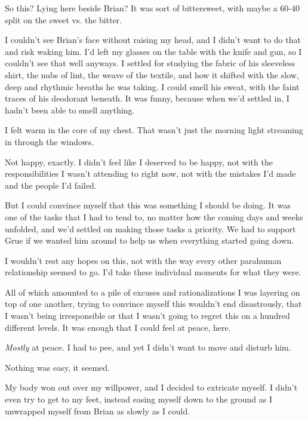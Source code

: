 So this?  Lying here beside Brian?  It was sort of bittersweet, with maybe a 60-40 split on the sweet vs. the bitter.



I couldn't see Brian's face without raising my head, and I didn't want to do that and risk waking him.  I'd left my glasses on the table with the knife and gun, so I couldn't see that well anyways.  I settled for studying the fabric of his sleeveless shirt, the nubs of lint, the weave of the textile, and how it shifted with the slow, deep and rhythmic breaths he was taking.  I could smell his sweat, with the faint traces of his deodorant beneath.  It was funny, because when we'd settled in, I hadn't been able to smell anything.



I felt warm in the core of my chest.  That wasn't just the morning light streaming in through the windows.



Not happy, exactly.  I didn't feel like I deserved to be happy, not with the responsibilities I wasn't attending to right now, not with the mistakes I'd made and the people I'd failed.



But I could convince myself that this was something I should be doing.  It was one of the tasks that I had to tend to, no matter how the coming days and weeks unfolded, and we'd settled on making those tasks a priority.  We had to support Grue if we wanted him around to help us when everything started going down.



I wouldn't rest any hopes on this, not with the way every other parahuman relationship seemed to go.  I'd take these individual moments for what they were.



All of which amounted to a pile of excuses and rationalizations I was layering on top of one another, trying to convince myself this wouldn't end disastrously, that I wasn't being irresponsible or that I wasn't going to regret this on a hundred different levels.  It was enough that I could feel at peace, here.



\emph{Mostly} at peace.  I had to pee, and yet I didn't want to move and disturb him.



Nothing was easy, it seemed.



My body won out over my willpower, and I decided to extricate myself.  I didn't even try to get to my feet, instead easing myself down to the ground as I unwrapped myself from Brian as slowly as I could.



